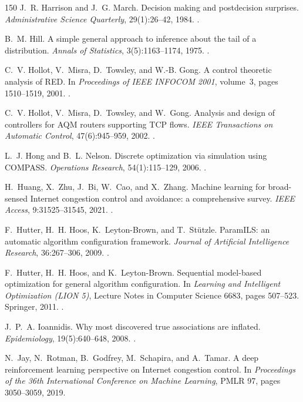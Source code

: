 \begin{thebibliography}{150}
J.~R. Harrison and J.~G. March. Decision making and postdecision surprises. \emph{Administrative Science Quarterly}, 29(1):26--42, 1984. .

B.~M. Hill. A simple general approach to inference about the tail of a distribution. \emph{Annals of Statistics}, 3(5):1163--1174, 1975. .

C.~V. Hollot, V.~Misra, D.~Towsley, and W.-B. Gong. A control theoretic analysis of RED. In \emph{Proceedings of IEEE INFOCOM 2001}, volume~3, pages 1510--1519, 2001. .

C.~V. Hollot, V.~Misra, D.~Towsley, and W.~Gong. Analysis and design of controllers for AQM routers supporting TCP flows. \emph{IEEE Transactions on Automatic Control}, 47(6):945--959, 2002. .

L.~J. Hong and B.~L. Nelson. Discrete optimization via simulation using COMPASS. \emph{Operations Research}, 54(1):115--129, 2006. .

H.~Huang, X.~Zhu, J.~Bi, W.~Cao, and X.~Zhang. Machine learning for broad-sensed Internet congestion control and avoidance: a comprehensive survey. \emph{IEEE Access}, 9:31525--31545, 2021. .

F.~Hutter, H.~H. Hoos, K.~Leyton-Brown, and T.~St{\"u}tzle. ParamILS: an automatic algorithm configuration framework. \emph{Journal of Artificial Intelligence Research}, 36:267--306, 2009. .

F.~Hutter, H.~H. Hoos, and K.~Leyton-Brown. Sequential model-based optimization for general algorithm configuration. In \emph{Learning and Intelligent Optimization (LION 5)}, Lecture Notes in Computer Science 6683, pages 507--523. Springer, 2011. .

J.~P.~A. Ioannidis. Why most discovered true associations are inflated. \emph{Epidemiology}, 19(5):640--648, 2008. .

N.~Jay, N.~Rotman, B.~Godfrey, M.~Schapira, and A.~Tamar. A deep reinforcement learning perspective on Internet congestion control. In \emph{Proceedings of the 36th International Conference on Machine Learning}, PMLR 97, pages 3050--3059, 2019.


\end{thebibliography}
